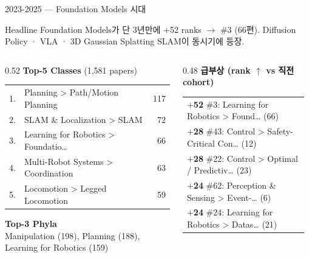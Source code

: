 \documentclass[aspectratio=169,t]{beamer}
\newcommand{\hot}[1]{\textcolor{accentorange}{\textbf{#1}}}
\newcommand{\muted}[1]{\textcolor{mutedgray}{#1}}
\begin{document}
\begin{frame}{2023-2025 \quad — \quad Foundation Models 시대}
\small
\begin{block}{Headline}
Foundation Models가 단 3년만에 +52 ranks $\to$ \#3 (66편). Diffusion Policy · VLA · 3D Gaussian Splatting SLAM이 동시기에 등장.
\end{block}
\vspace{4pt}

\begin{columns}[T,onlytextwidth]
\begin{column}{0.52\textwidth}
\textbf{Top-5 Classes} \muted{\scriptsize (1,581 papers)}\\[2pt]
\scriptsize
\begin{tabular}{@{}rlr@{}}
    1. & Planning > Path/Motion Planning & 117 \\
    2. & SLAM \& Localization > SLAM & 72 \\
    3. & Learning for Robotics > Foundatio… & 66 \\
    4. & Multi-Robot Systems > Coordination & 63 \\
    5. & Locomotion > Legged Locomotion & 59 \\
\end{tabular}
\vspace{8pt}

\textbf{\small Top-3 Phyla}\\[2pt]
\scriptsize Manipulation (198), Planning (188), Learning for Robotics (159)
\end{column}

\begin{column}{0.48\textwidth}
\textbf{급부상 (rank $\uparrow$ vs 직전 cohort)}\\[2pt]
\scriptsize
\begin{tabular}{@{}p{0.95\linewidth}@{}}
    \hot{$+$52} \#3: Learning for Robotics > Found… (66) \\
    \hot{$+$28} \#43: Control > Safety-Critical Con… (12) \\
    \hot{$+$28} \#22: Control > Optimal / Predictiv… (23) \\
    \hot{$+$24} \#62: Perception \& Sensing > Event-… (6) \\
    \hot{$+$24} \#24: Learning for Robotics > Datas… (21) \\
\end{tabular}
\end{column}
\end{columns}
\end{frame}
\end{document}
